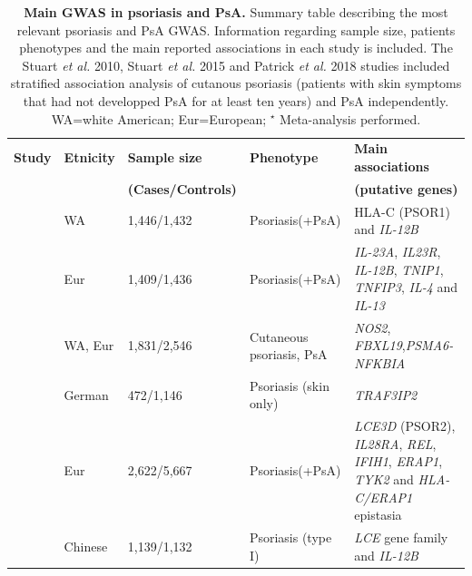 %
\begin{landscape}
\begin{center}
\renewcommand{\arraystretch}{0.7}	
\begin{longtable}[ht]{p{.25\textheight} p{.25\textheight} p{.20\textheight} p{.20\textheight} p{.50\textheight}}
\caption[Main GWAS in psoriasis and PsA]{\textbf{Main GWAS in psoriasis and PsA.} Summary table describing the most relevant psoriasis and PsA GWAS. Information regarding sample size, patients phenotypes and the main reported associations in each study is included. The Stuart \textit{et al.} 2010, Stuart \textit{et al.} 2015 and Patrick \textit{et al.} 2018 studies included stratified association analysis of cutanous psoriasis (patients with skin symptoms that had not developped PsA for at least ten years) and PsA independently. WA=white American; Eur=European; $^\star$ Meta-analysis performed.}
\label{tab:GWAS_summary} \\
\toprule
\textbf{Study} & \textbf{Etnicity} & \textbf{Sample size}      & \textbf{Phenotype} & \textbf{Main associations} \\
               &                   & \textbf{(Cases/Controls)} &                    &  \textbf{(putative genes)}                  \\
\midrule
\midrule
\parencite{Cargill2007} &	WA &	1,446/1,432 & Psoriasis(+PsA) &	HLA-C (PSOR1) and \textit{IL-12B} \\
\parencite{Nair2009} &	Eur	& 1,409/1,436 &	Psoriasis(+PsA) &	\textit{IL-23A}, \textit{IL23R}, \textit{IL-12B}, \textit{TNIP1}, \textit{TNFIP3}, \textit{IL-4} and \textit{IL-13} \\
\parencite{Stuart2010} &	WA, Eur &	1,831/2,546	& Cutaneous psoriasis, PsA &	\textit{NOS2}, \textit{FBXL19},\textit{PSMA6-NFKBIA} \\

\parencite{Ellinghaus2010} &	German	& 472/1,146	& Psoriasis (skin only) & \textit{TRAF3IP2} \\

\parencite{Strange2010} &	Eur & 2,622/5,667 & Psoriasis(+PsA) & \textit{LCE3D} (PSOR2), \textit{IL28RA}, \textit{REL}, \textit{IFIH1}, \textit{ERAP1}, \textit{TYK2} and \textit{HLA-C/ERAP1} epistasia \\

\parencite{Zhang2008} & Chinese	& 1,139/1,132	& Psoriasis (type I)  & \textit{LCE} gene family and \textit{IL-12B} \\


\end{longtable}
\end{center}
\end{landscape}
